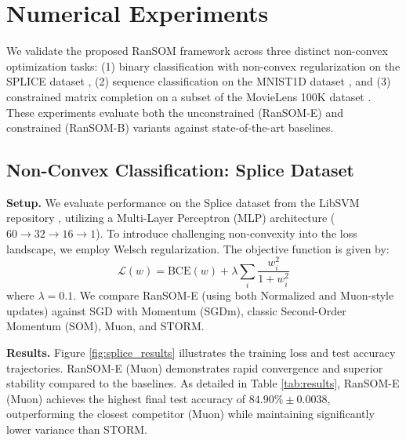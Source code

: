 \documentclass{article}
\theoremstyle{plain}
\theoremstyle{definition}
\theoremstyle{remark}
\begin{document}
\section{Numerical Experiments}

We validate the proposed RanSOM framework across three distinct non-convex optimization tasks: (1) binary classification with non-convex regularization on the SPLICE dataset \cite{libsvm}, (2) sequence classification on the MNIST1D dataset \cite{mnist1d}, and (3) constrained matrix completion on a subset of the MovieLens 100K dataset \cite{movielens}. These experiments evaluate both the unconstrained (RanSOM-E) and constrained (RanSOM-B) variants against state-of-the-art baselines.

\subsection{Non-Convex Classification: Splice Dataset}

\textbf{Setup.} We evaluate performance on the Splice dataset from the LibSVM repository \cite{libsvm}, utilizing a Multi-Layer Perceptron (MLP) architecture ($60 \to 32 \to 16 \to 1$). To introduce challenging non-convexity into the loss landscape, we employ Welsch regularization. The objective function is given by:
\[
\mathcal{L}(w) = \text{BCE}(w) + \lambda \sum_{i} \frac{w_i^2}{1 + w_i^2}
\]
where $\lambda=0.1$. We compare RanSOM-E (using both Normalized and Muon-style updates) against SGD with Momentum (SGDm), classic Second-Order Momentum (SOM), Muon, and STORM.

\textbf{Results.} Figure \ref{fig:splice_results} illustrates the training loss and test accuracy trajectories. RanSOM-E (Muon) demonstrates rapid convergence and superior stability compared to the baselines. As detailed in Table \ref{tab:results}, RanSOM-E (Muon) achieves the highest final test accuracy of $\mathbf{84.90\%} \pm 0.0038$, outperforming the closest competitor (Muon) while maintaining significantly lower variance than STORM.
\end{document}
